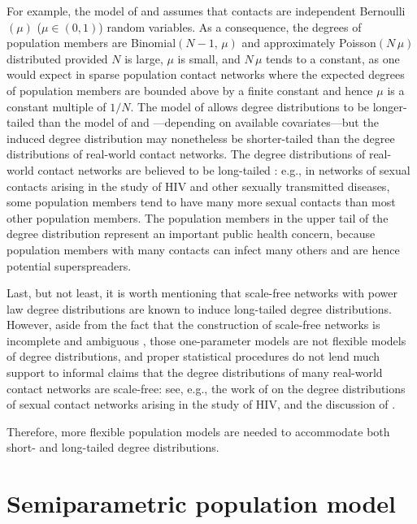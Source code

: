 \documentclass[12pt,usenatbib,referee]{article}
\begin{document}
For example,
the model of \citet{BrNe02} and \citet{GrWeHu10} assumes that contacts are independent Bernoulli$(\mu)$ ($\mu \in (0, 1)$) random variables.
As a consequence,
the degrees of population members are Binomial$(N-1,\, \mu)$ and approximately Poisson$(N\, \mu)$ distributed provided $N$ is large, $\mu$ is small, and $N\, \mu$ tends to a constant,
as one would expect in sparse population contact networks where the expected degrees of population members are bounded above by a finite constant and hence $\mu$ is a constant multiple of $1 / N$.
The model of \citet{GrWeHu11} allows degree distributions to be longer-tailed than the model of \citet{BrNe02} and \citet{GrWeHu10}---depending on available covariates---but the induced degree distribution may nonetheless be shorter-tailed than the degree distributions of real-world contact networks.
The degree distributions of real-world contact networks are believed to be long-tailed \citep[e.g.,][]{La94,AlBa02,JoHa04,JoHa03,HaJo04}:
e.g.,
in networks of sexual contacts arising in the study of HIV and other sexually transmitted diseases,
some population members tend to have many more sexual contacts than most other population members.
The population members in the upper tail of the degree distribution represent an important public health concern,
because population members with many contacts can infect many others and are hence potential superspreaders.

Last,
but not least,
it is worth mentioning that scale-free networks with power law degree distributions \citep{BaAl99,AlBa02} are known to induce long-tailed degree distributions.
However,
aside from the fact that the construction of scale-free networks is incomplete and ambiguous \citep*[][]{Boetal01},
those one-parameter models are not flexible models of degree distributions, 
and proper statistical procedures do not lend much support to informal claims that the degree distributions of many real-world contact networks are scale-free:
see,
e.g.,
the work of \citet{JoHa04,JoHa03,HaJo04} on the degree distributions of sexual contact networks arising in the study of HIV, 
and the discussion of \citet*{scalefree}.

Therefore,
more flexible population models are needed to accommodate both short- and long-tailed degree distributions.

\section{Semiparametric population model}
\label{population.model}
\end{document}
